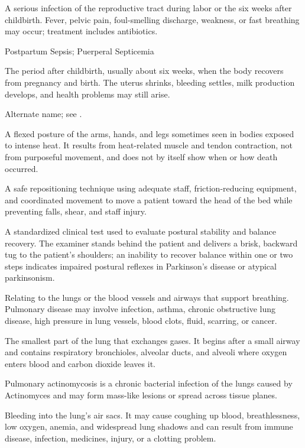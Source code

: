 A serious infection of the reproductive tract during labor or the six weeks after childbirth. Fever, pelvic pain, foul-smelling discharge, weakness, or fast breathing may occur; treatment includes antibiotics.

\synonyms
Postpartum Sepsis; Puerperal Septicemia

 The period after childbirth, usually about six weeks, when the body recovers from pregnancy and birth. The uterus shrinks, bleeding settles, milk production develops, and health problems may still arise.

 Alternate name; see .

 A flexed posture of the arms, hands, and legs sometimes seen in bodies exposed to intense heat. It results from heat-related muscle and tendon contraction, not from purposeful movement, and does not by itself show when or how death occurred.

 A safe repositioning technique using adequate staff, friction-reducing equipment, and coordinated movement to move a patient toward the head of the bed while preventing falls, shear, and staff injury.

 A standardized clinical test used to evaluate postural stability and balance recovery. The examiner stands behind the patient and delivers a brisk, backward tug to the patient's shoulders; an inability to recover balance within one or two steps indicates impaired postural reflexes in Parkinson's disease or atypical parkinsonism.

 Relating to the lungs or the blood vessels and airways that support breathing. Pulmonary disease may involve infection, asthma, chronic obstructive lung disease, high pressure in lung vessels, blood clots, fluid, scarring, or cancer.

 The smallest part of the lung that exchanges gases. It begins after a small airway and contains respiratory bronchioles, alveolar ducts, and alveoli where oxygen enters blood and carbon dioxide leaves it.

 Pulmonary actinomycosis is a chronic bacterial infection of the lungs caused by Actinomyces and may form mass-like lesions or spread across tissue planes.

 Bleeding into the lung’s air sacs. It may cause coughing up blood, breathlessness, low oxygen, anemia, and widespread lung shadows and can result from immune disease, infection, medicines, injury, or a clotting problem.

